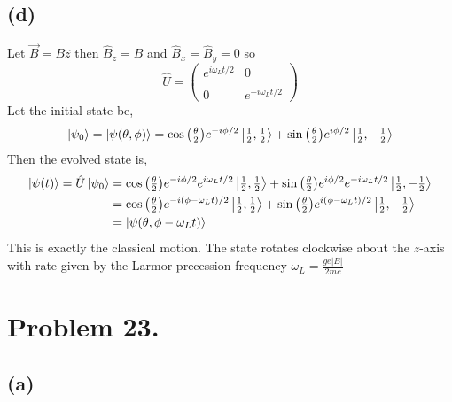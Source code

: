 \documentclass[12pt]{extarticle}
\begin{document}
\subsection*{(d)} 

Let $\vec{B} = B \hat{z}$ then $\hat{B}_z = B$ and $\hat{B}_x = \hat{B}_y = 0$ so
\[ \hat{U} = 
\begin{pmatrix}
e^{i \omega_L t /2} & 0 \\ \\
0  & e^{-i \omega_L t /2}
\end{pmatrix}
\]
Let the initial state be, 
\[\left| \psi_0 \right> = \left| \psi(\theta, \phi) \right> =  \cos{\left(\tfrac{\theta}{2} \right)} e^{- i \phi/2} \left| \tfrac{1}{2}, \tfrac{1}{2} \right> + \sin{\left(\tfrac{\theta}{2} \right)} e^{i \phi/2} \left| \tfrac{1}{2}, - \tfrac{1}{2} \right> \]
Then the evolved state is,
\begin{align*}
\left| \psi(t) \right> = \hat{U} \left| \psi_0 \right> & = \cos{\left(\tfrac{\theta}{2} \right)} e^{- i \phi/2} e^{i \omega_L t /2} \left| \tfrac{1}{2}, \tfrac{1}{2} \right> + \sin{\left(\tfrac{\theta}{2} \right)} e^{i \phi/2} e^{- i \omega_L t /2} \left| \tfrac{1}{2}, - \tfrac{1}{2} \right> \\ & = 
\cos{\left(\tfrac{\theta}{2} \right)} e^{- i (\phi - \omega_L t) /2} \left| \tfrac{1}{2}, \tfrac{1}{2} \right> + \sin{\left(\tfrac{\theta}{2} \right)} e^{i (\phi - \omega_L t)/2}  \left| \tfrac{1}{2}, - \tfrac{1}{2} \right> \\ & = \left| \psi(\theta, \phi - \omega_L t) \right>
\end{align*}
This is exactly the classical motion. The state rotates clockwise about the $z$-axis with rate given by the Larmor precession frequency $\omega_L = \frac{g e |B|}{2 m c}$


\section*{Problem 23.}

\subsection*{(a)}
\end{document}
